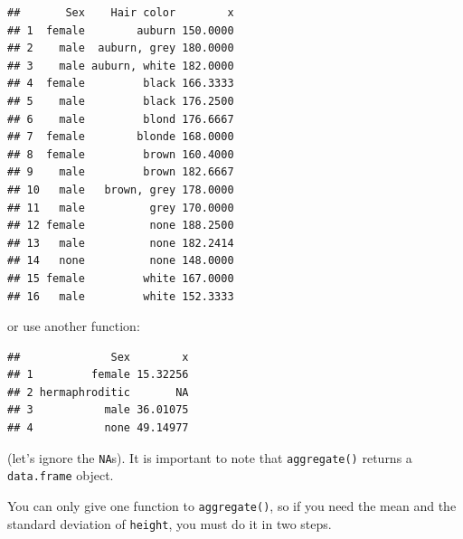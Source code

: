 \documentclass[
]{article}
\newenvironment{Shaded}{\begin{snugshade}}{\end{snugshade}}
\newcommand{\AttributeTok}[1]{\textcolor[rgb]{0.77,0.63,0.00}{#1}}
\newcommand{\FunctionTok}[1]{\textcolor[rgb]{0.00,0.00,0.00}{#1}}
\newcommand{\NormalTok}[1]{#1}
\newcommand{\OtherTok}[1]{\textcolor[rgb]{0.56,0.35,0.01}{#1}}
\newcommand{\SpecialCharTok}[1]{\textcolor[rgb]{0.00,0.00,0.00}{#1}}
\newcommand{\StringTok}[1]{\textcolor[rgb]{0.31,0.60,0.02}{#1}}
\begin{document}
\begin{Shaded}
\end{Shaded}

\begin{verbatim}
##       Sex    Hair color        x
## 1  female        auburn 150.0000
## 2    male  auburn, grey 180.0000
## 3    male auburn, white 182.0000
## 4  female         black 166.3333
## 5    male         black 176.2500
## 6    male         blond 176.6667
## 7  female        blonde 168.0000
## 8  female         brown 160.4000
## 9    male         brown 182.6667
## 10   male   brown, grey 178.0000
## 11   male          grey 170.0000
## 12 female          none 188.2500
## 13   male          none 182.2414
## 14   none          none 148.0000
## 15 female         white 167.0000
## 16   male         white 152.3333
\end{verbatim}

or use another function:

\begin{Shaded}
\end{Shaded}

\begin{verbatim}
##              Sex        x
## 1         female 15.32256
## 2 hermaphroditic       NA
## 3           male 36.01075
## 4           none 49.14977
\end{verbatim}

(let's ignore the \texttt{NA}s). It is important to note that \texttt{aggregate()} returns a \texttt{data.frame} object.

You can only give one function to \texttt{aggregate()}, so if you need the mean and the standard deviation of \texttt{height},
you must do it in two steps.
\end{document}
